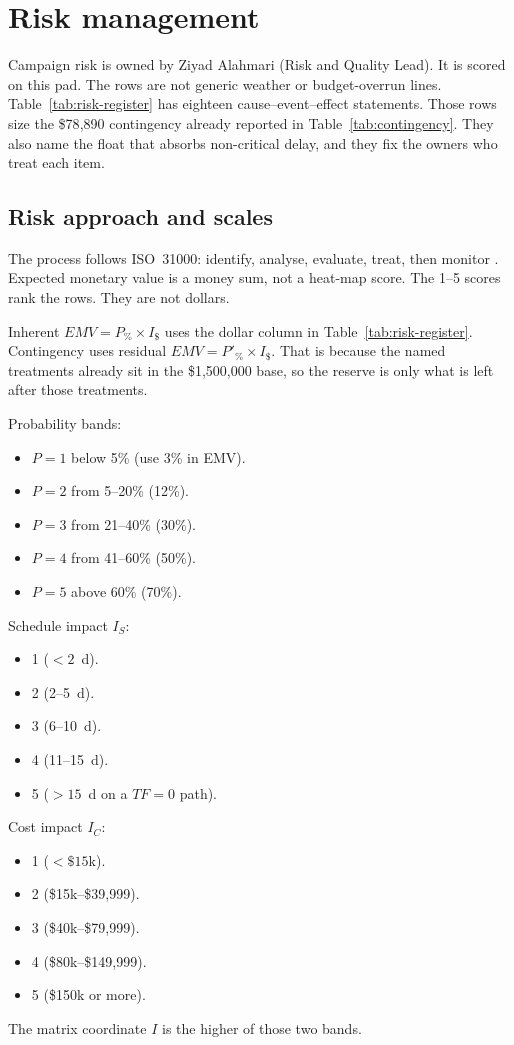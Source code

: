 \section{Risk management}
\label{sec:risk}

Campaign risk is owned by Ziyad Alahmari (Risk and Quality Lead). It is scored on this pad. The rows are not generic weather or budget-overrun lines. Table~\ref{tab:risk-register} has eighteen cause--event--effect statements. Those rows size the \$78{,}890 contingency already reported in Table~\ref{tab:contingency}. They also name the float that absorbs non-critical delay, and they fix the owners who treat each item.

\subsection{Risk approach and scales}
\label{sec:risk-approach}

The process follows ISO~31000: identify, analyse, evaluate, treat, then monitor \citep{iso31000}. Expected monetary value is a money sum, not a heat-map score. The 1--5 scores rank the rows. They are not dollars.

Inherent $EMV = P_{\%} \times I_{\$}$ uses the dollar column in Table~\ref{tab:risk-register}. Contingency uses residual $EMV = P'_{\%} \times I_{\$}$. That is because the named treatments already sit in the \$1{,}500{,}000 base, so the reserve is only what is left after those treatments.

Probability bands:
\begin{itemize}[leftmargin=1.4em,itemsep=0.25em]
\item $P=1$ below 5\% (use 3\% in EMV).
\item $P=2$ from 5--20\% (12\%).
\item $P=3$ from 21--40\% (30\%).
\item $P=4$ from 41--60\% (50\%).
\item $P=5$ above 60\% (70\%).
\end{itemize}
Schedule impact $I_{S}$:
\begin{itemize}[leftmargin=1.4em,itemsep=0.25em]
\item 1 ($<2$~d).
\item 2 (2--5~d).
\item 3 (6--10~d).
\item 4 (11--15~d).
\item 5 ($>15$~d on a $TF=0$ path).
\end{itemize}
Cost impact $I_{C}$:
\begin{itemize}[leftmargin=1.4em,itemsep=0.25em]
\item 1 ($<\$15$k).
\item 2 (\$15k--\$39{,}999).
\item 3 (\$40k--\$79{,}999).
\item 4 (\$80k--\$149{,}999).
\item 5 (\$150k or more).
\end{itemize}
The matrix coordinate $I$ is the higher of those two bands.

